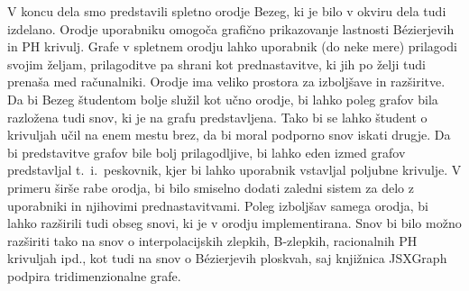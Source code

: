 \documentclass[isrm2, tisk]{fmfdelo}
\begin{document}
    V koncu dela smo predstavili spletno orodje Bezeg, ki je bilo v okviru dela tudi izdelano.
    Orodje uporabniku omogoča grafično prikazovanje lastnosti Bézierjevih in PH krivulj.
    Grafe v spletnem orodju lahko uporabnik (do neke mere) prilagodi svojim željam, prilagoditve pa shrani kot prednastavitve, ki jih po želji tudi prenaša med računalniki.
    Orodje ima veliko prostora za izboljšave in razširitve.
    Da bi Bezeg študentom bolje služil kot učno orodje, bi lahko poleg grafov bila razložena tudi snov, ki je na grafu predstavljena.
    Tako bi se lahko študent o krivuljah učil na enem mestu brez, da bi moral podporno snov iskati drugje.
    Da bi predstavitve grafov bile bolj prilagodljive, bi lahko eden izmed grafov predstavljal t.\ i.\ peskovnik, kjer bi lahko uporabnik vstavljal poljubne krivulje.
    V primeru širše rabe orodja, bi bilo smiselno dodati zaledni sistem za delo z uporabniki in njihovimi prednastavitvami.
    Poleg izboljšav samega orodja, bi lahko razširili tudi obseg snovi, ki je v orodju implementirana.
    Snov bi bilo možno razširiti tako na snov o interpolacijskih zlepkih, B-zlepkih, racionalnih PH krivuljah ipd., kot tudi na snov o Bézierjevih ploskvah, saj knjižnica JSXGraph podpira tridimenzionalne grafe.


%
%
%
%
\end{document}

